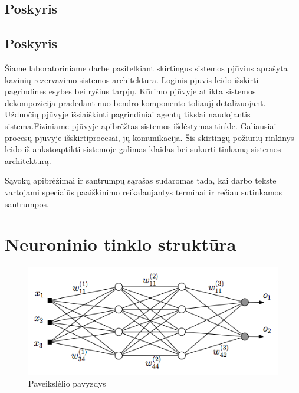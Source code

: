 \documentclass{VUMIFPSkursinis}
\begin{document}
\subsection{Poskyris}
\subsection{Poskyris}

Šiame laboratoriniame darbe pasitelkiant skirtingus sistemos pjūvius aprašyta kavinių rezervavimo sistemos architektūra. Loginis pjūvis leido išskirti pagrindines esybes bei ryšius tarpjų. Kūrimo pjūvyje atlikta sistemos dekompozicija pradedant nuo bendro komponento toliaujį detalizuojant. Užduočių pjūvyje išsiaiškinti pagrindiniai agentų tikslai naudojantis sistema.Fiziniame pjūvyje apibrėžtas sistemos išdėstymas tinkle.  Galiausiai procesų pjūvyje išskirtiprocesai, jų komunikacija. Šis skirtingų požiūrių rinkinys leido iš ankstoaptikti sistemoje galimas klaidas bei sukurti tinkamą sistemos architektūrą.

\printbibliography[heading=bibintoc, title=Šaltiniai]  %

Sąvokų apibrėžimai ir santrumpų sąrašas sudaromas tada, kai darbo tekste
vartojami specialūs paaiškinimo reikalaujantys terminai ir rečiau sutinkamos
santrumpos.

\appendix  %

\section{Neuroninio tinklo struktūra}
\begin{figure}[H]
    \centering
    \includegraphics[scale=0.5]{img/MLP}
    \caption{Paveikslėlio pavyzdys}
    \label{img:mlp}
\end{figure}
\end{document}
